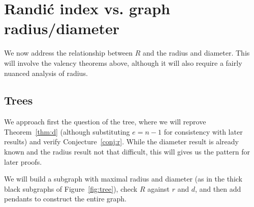 \documentclass{amsart}
\theoremstyle{definition}
\begin{document}
\section{Randi\'c index vs. graph radius/diameter}\label{sec:rd}

We now address the relationship between $R$ and the radius and diameter. This will involve the valency theorems above, although it will also require a fairly nuanced analysis of radius.

\subsection{Trees}
We approach first the question of the tree, where we will reprove Theorem~\ref{thm:d} (although substituting $e=n-1$ for consistency with later results) and verify Conjecture~\ref{conj:r}. While the diameter result is already known and the radius result not that difficult, this will gives us the pattern for later proofs. 

We will build a subgraph with maximal radius and diameter (as in the thick black subgraphs of Figure~\ref{fig:tree}), check $R$ against $r$ and $d$, and then add pendants to construct the entire graph.%
\end{document}
